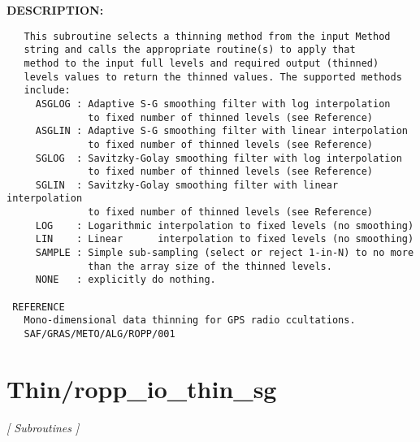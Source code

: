 \textbf{DESCRIPTION:}\hspace{0.08in}\begin{Verbatim}
   This subroutine selects a thinning method from the input Method
   string and calls the appropriate routine(s) to apply that
   method to the input full levels and required output (thinned)
   levels values to return the thinned values. The supported methods
   include:
     ASGLOG : Adaptive S-G smoothing filter with log interpolation
              to fixed number of thinned levels (see Reference)
     ASGLIN : Adaptive S-G smoothing filter with linear interpolation
              to fixed number of thinned levels (see Reference)
     SGLOG  : Savitzky-Golay smoothing filter with log interpolation
              to fixed number of thinned levels (see Reference)
     SGLIN  : Savitzky-Golay smoothing filter with linear interpolation
              to fixed number of thinned levels (see Reference)
     LOG    : Logarithmic interpolation to fixed levels (no smoothing)
     LIN    : Linear      interpolation to fixed levels (no smoothing)
     SAMPLE : Simple sub-sampling (select or reject 1-in-N) to no more
              than the array size of the thinned levels.
     NONE   : explicitly do nothing.

 REFERENCE
   Mono-dimensional data thinning for GPS radio ccultations.
   SAF/GRAS/METO/ALG/ROPP/001
\end{Verbatim}
\section{Thin/ropp\_io\_thin\_sg}
\textsl{[ Subroutines ]}

